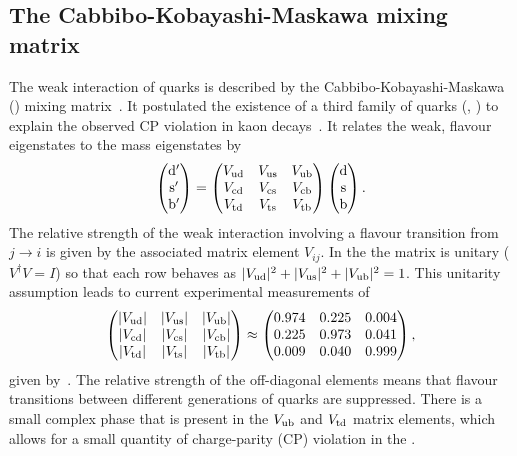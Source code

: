 \subsection{The Cabbibo-Kobayashi-Maskawa mixing matrix} %
\label{sub:the_cabbibo_kobayashi_maskawa_mixing_matrix}
The weak interaction of quarks is described by the Cabbibo-Kobayashi-Maskawa (\CKM{}) mixing matrix~\cite{Th:CKM1, Th:CKM2}.
It postulated the existence of a third family of quarks (\tquark{}, \bquark{}) to explain the observed CP violation in kaon decays~\cite{Th:CKM2}.
It relates the weak, flavour eigenstates to the mass eigenstates by
\begin{equation*}
\begin{pmatrix}
\mathrm{d}' \\
\mathrm{s}' \\
\mathrm{b}'
\end{pmatrix}
=
\begin{pmatrix}
V_{\mathrm{u}\mathrm{d}} & V_{\mathrm{u}\mathrm{s}} & V_{\mathrm{u}\mathrm{b}} \\
V_{\mathrm{c}\mathrm{d}} & V_{\mathrm{c}\mathrm{s}} & V_{\mathrm{c}\mathrm{b}} \\
V_{\mathrm{t}\mathrm{d}} & V_{\mathrm{t}\mathrm{s}} & V_{\mathrm{t}\mathrm{b}}
\end{pmatrix}
\begin{pmatrix}
\mathrm{d} \\
\mathrm{s} \\
\mathrm{b}
\end{pmatrix}.
\end{equation*}
The relative strength of the weak interaction involving a flavour transition from $j\rightarrow i$ is given by the associated \CKM{} matrix element $V_{ij}$.
In the \SM{} the \CKM{} matrix is unitary ($V^{\dag}V=I$) so that each row behaves as $\lvert V_{\mathrm{u}\mathrm{d}} \rvert^2 + \lvert V_{\mathrm{u}\mathrm{s}} \rvert^2 + \lvert V_{\mathrm{u}\mathrm{b}} \rvert^2 = 1$.
This unitarity assumption leads to current experimental measurements of
\begin{equation*}
\begin{pmatrix}
\lvert V_{\mathrm{u}\mathrm{d}} \rvert & \lvert V_{\mathrm{u}\mathrm{s}} \rvert & \lvert V_{\mathrm{u}\mathrm{b}} \rvert \\
\lvert V_{\mathrm{c}\mathrm{d}} \rvert & \lvert V_{\mathrm{c}\mathrm{s}} \rvert & \lvert V_{\mathrm{c}\mathrm{b}} \rvert \\
\lvert V_{\mathrm{t}\mathrm{d}} \rvert & \lvert V_{\mathrm{t}\mathrm{s}} \rvert & \lvert V_{\mathrm{t}\mathrm{b}} \rvert
\end{pmatrix}
\approx
\begin{pmatrix}
0.974 & 0.225 & 0.004 \\
0.225 & 0.973 & 0.041 \\
0.009 & 0.040 & 0.999
\end{pmatrix},
\end{equation*}
given by~\cite{PDG}.
The relative strength of the off-diagonal \CKM{} elements means that flavour transitions between different generations of quarks are suppressed.
There is a small complex phase that is present in the $V_{\mathrm{u}\mathrm{b}}$ and $V_{\mathrm{t}\mathrm{d}}$ matrix elements, which allows for a small quantity of charge-parity (CP) violation in the \SM{}.

